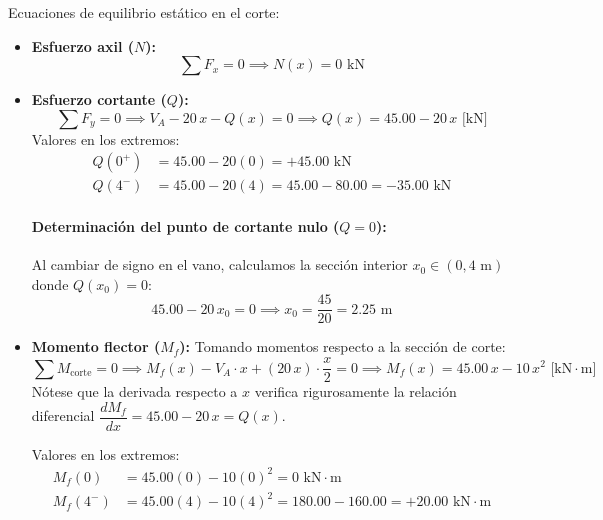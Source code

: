Ecuaciones de equilibrio estático en el corte:
\begin{itemize}
    \item \textbf{Esfuerzo axil ($N$):}
          \begin{equation}
              \sum F_x = 0 \implies \boxed{N(x) = 0\text{ kN}}
          \end{equation}

    \item \textbf{Esfuerzo cortante ($Q$):}
          \begin{equation}
              \sum F_y = 0 \implies V_A - 20\,x - Q(x) = 0 \implies \boxed{Q(x) = 45.00 - 20\,x\text{ [kN]}}
          \end{equation}
          Valores en los extremos:
          \begin{align*}
              Q(0^+) & = 45.00 - 20(0) = \boxed{+45.00\text{ kN}}                 \\
              Q(4^-) & = 45.00 - 20(4) = 45.00 - 80.00 = \boxed{-35.00\text{ kN}}
          \end{align*}

          \paragraph{Determinación del punto de cortante nulo ($Q = 0$):}
          Al cambiar de signo en el vano, calculamos la sección interior $x_0 \in (0, 4\text{ m})$ donde $Q(x_0) = 0$:
          \begin{equation}
              45.00 - 20\,x_0 = 0 \implies \boxed{x_0 = \frac{45}{20} = 2.25\text{ m}}
          \end{equation}

    \item \textbf{Momento flector ($M_f$):}
          Tomando momentos respecto a la sección de corte:
          \begin{equation}
              \sum M_{\text{corte}} = 0 \implies M_f(x) - V_A \cdot x + (20\,x)\cdot\frac{x}{2} = 0 \implies \boxed{M_f(x) = 45.00\,x - 10\,x^2\text{ [kN}\cdot\text{m]}}
          \end{equation}
          Nótese que la derivada respecto a $x$ verifica rigurosamente la relación diferencial $\dfrac{dM_f}{dx} = 45.00 - 20\,x = Q(x)$.

          Valores en los extremos:
          \begin{align*}
              M_f(0)   & = 45.00(0) - 10(0)^2 = \boxed{0\text{ kN}\cdot\text{m}}                        \\
              M_f(4^-) & = 45.00(4) - 10(4)^2 = 180.00 - 160.00 = \boxed{+20.00\text{ kN}\cdot\text{m}}
          \end{align*}


\end{itemize}
